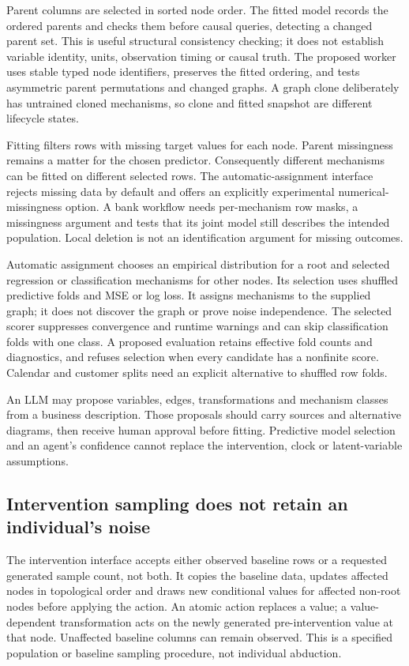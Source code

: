 Parent columns are selected in sorted node order. The fitted model records
the ordered parents and checks them before causal queries, detecting a
changed parent set. This is useful structural consistency checking; it
does not establish variable identity, units, observation timing or causal
truth. The proposed worker uses stable typed node identifiers, preserves
the fitted ordering, and tests asymmetric parent permutations and changed
graphs. A graph clone deliberately has untrained cloned mechanisms, so
clone and fitted snapshot are different lifecycle states.
\citep{exec24_gcm_source,exec24_gcm_choice}

Fitting filters rows with missing target values for each node. Parent
missingness remains a matter for the chosen predictor. Consequently
different mechanisms can be fitted on different selected rows. The
automatic-assignment interface rejects missing data by default and offers
an explicitly experimental numerical-missingness option. A bank workflow
needs per-mechanism row masks, a missingness argument and tests that its
joint model still describes the intended population. Local deletion is
not an identification argument for missing outcomes.
\citep{exec24_gcm_source,exec24_gcm_choice}

Automatic assignment chooses an empirical distribution for a root and
selected regression or classification mechanisms for other nodes. Its
selection uses shuffled predictive folds and MSE or log loss. It assigns
mechanisms to the supplied graph; it does not discover the graph or prove
noise independence. The selected scorer suppresses convergence and runtime
warnings and can skip classification folds with one class. A proposed
evaluation retains effective fold counts and diagnostics, and refuses
selection when every candidate has a nonfinite score. Calendar and
customer splits need an explicit alternative to shuffled row folds.
\citep{exec24_gcm_source,exec24_gcm_choice}

An LLM may propose variables, edges, transformations and mechanism classes
from a business description. Those proposals should carry sources and
alternative diagrams, then receive human approval before fitting. Predictive
model selection and an agent's confidence cannot replace the intervention,
clock or latent-variable assumptions.~\citep{exec24_gcm_choice}

\subsection{Intervention sampling does not retain an individual's noise}
The intervention interface accepts either observed baseline rows or a
requested generated sample count, not both. It copies the baseline data,
updates affected nodes in topological order and draws new conditional
values for affected non-root nodes before applying the action. An atomic
action replaces a value; a value-dependent transformation acts on the
newly generated pre-intervention value at that node. Unaffected baseline
columns can remain observed. This is a specified population or baseline
sampling procedure, not individual abduction.~\citep{exec24_gcm_source}

